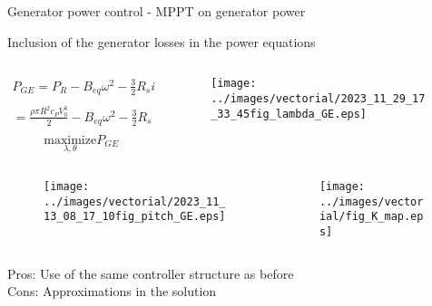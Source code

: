 \begin{frame}{Generator power control - MPPT on generator power}

  Inclusion of the generator losses in the power equations
  

  \begin{columns}
    \begin{column}{0.5\columnwidth}
      {\scriptsize
      \begin{gather*}
        P_{GE} = P_R - B_{eq}\omega^2 - \frac{3}{2} R_s i_q^2 =\\
        =\frac{\rho\pi R^2c_PV_0^3}{2} - B_{eq}\omega^2-\frac{3}{2}R_s\left(\frac{A \, c_P \, \rho \, V_0^3 \,-\,2B_{eq}{\omega}^2}{3\omega\,p\,\Lambda_{mg}}\right)^2 
      \end{gather*}
      \begin{equation*}
      \underset{\lambda, \theta}{\text{maximize}} P_{GE}
      \end{equation*}
      }
    \end{column}
    \begin{column}{0.5\columnwidth}
      \begin{figure}
        \centering
        \texttt{[image: ../images/vectorial/2023\_11\_29\_17\_33\_45fig\_lambda\_GE.eps]}
      \end{figure}
    \end{column}
  \end{columns}

\begin{columns}
\begin{column}{0.5\columnwidth}
  \begin{figure}[!htbp]
    \centering
    \texttt{[image: ../images/vectorial/2023\_11\_13\_08\_17\_10fig\_pitch\_GE.eps]}
  \end{figure}
\end{column}
\begin{column}{0.5\columnwidth}
  \begin{figure}[!htbp]
    \centering
    \texttt{[image: ../images/vectorial/fig\_K\_map.eps]}
  \end{figure}
  \end{column}
\end{columns}

\textcolor{yaleblue}{Pros: } Use of the same controller structure as before\\
\textcolor{bostonuniversityred}{Cons: } Approximations in the solution


\end{frame}
